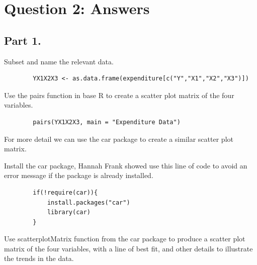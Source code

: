 \documentclass[12pt,letterpaper]{article}
\begin{document}
	\section*{Question 2: Answers}
	
	\subsection*{Part 1.}
	Subset and name the relevant data.
	
	\begin{Verbatim}
		YX1X2X3 <- as.data.frame(expenditure[c("Y","X1","X2","X3")])
	\end{Verbatim}
	Use the pairs function in base R to create a scatter plot matrix of the four variables.
	\begin{Verbatim}
		pairs(YX1X2X3, main = "Expenditure Data")
	\end{Verbatim}
	
     For more detail we can use the car package to create a similar scatter plot matrix.
     
     Install the car package, Hannah Frank showed use this line of code to avoid an error message if the package is already installed.
     \begin{Verbatim}
     	if(!require(car)){
     		install.packages("car")
     		library(car)
     	}
     \end{Verbatim}
     
     Use scatterplotMatrix function from the car package to produce a scatter plot matrix of the four variables, with a line of best fit, and other details to illustrate the trends in the data. 
     
\end{document}
